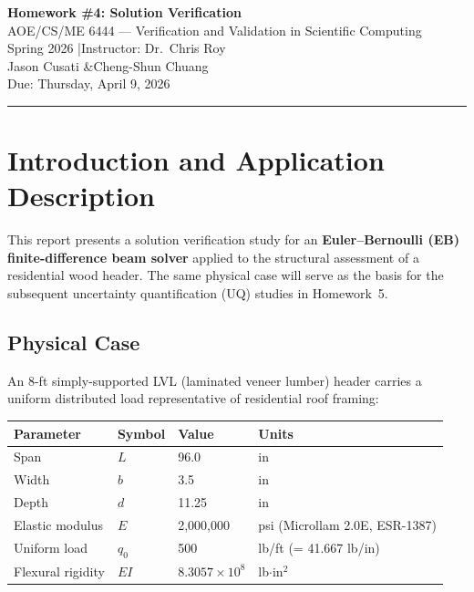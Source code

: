 \documentclass[11pt,letterpaper]{article}
\newcommand{\EI}{EI}
\begin{document}
\begin{center}
  {\LARGE\bfseries Homework \#4: Solution Verification}\\[6pt]
  {\large AOE/CS/ME 6444 — Verification and Validation in Scientific Computing}\\
  {\large Spring 2026 \quad|\quad Instructor: Dr.\ Chris Roy}\\[4pt]
  {\large Jason Cusati \quad\&\quad Cheng-Shun Chuang}\\[2pt]
  {\normalsize Due: Thursday, April 9, 2026}
\end{center}
\vspace{6pt}
\hrule
\vspace{10pt}

\section{Introduction and Application Description}
\label{sec:intro}

This report presents a solution verification study for an \textbf{Euler–Bernoulli (EB)
finite-difference beam solver} applied to the structural assessment of a residential
wood header.  The same physical case will serve as the basis for the subsequent
uncertainty quantification (UQ) studies in Homework~5.

\subsection*{Physical Case}

An 8-ft simply-supported LVL (laminated veneer lumber) header carries a uniform
distributed load representative of residential roof framing:

\begin{center}
\begin{tabular}{llll}
  \toprule
  Parameter & Symbol & Value & Units \\
  \midrule
  Span            & $L$      & 96.0   & in \\
  Width           & $b$      & 3.5    & in \\
  Depth           & $d$      & 11.25  & in \\
  Elastic modulus & $E$      & 2,000,000 & psi \;(Microllam 2.0E, ESR-1387) \\
  Uniform load    & $q_0$    & 500    & lb/ft \;(= 41.667 lb/in) \\
  Flexural rigidity & $\EI$ & $8.3057\times10^8$ & lb$\cdot$in$^2$ \\
  \bottomrule
\end{tabular}
\end{center}
\end{document}
